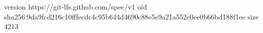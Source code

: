 version https://git-lfs.github.com/spec/v1
oid sha256:9da9fcd216c10fffecdc4c95b644d4690c88e5e9a21a552c0ee0b66bd188f1ee
size 4213
